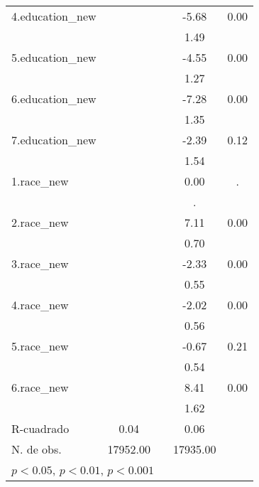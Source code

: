 {\begin{tabular}{l*{2}{cc}}
4.education\_new&                     &            &       -5.68\sym{***}&        0.00\\
            &                     &            &        1.49         &            \\
5.education\_new&                     &            &       -4.55\sym{***}&        0.00\\
            &                     &            &        1.27         &            \\
6.education\_new&                     &            &       -7.28\sym{***}&        0.00\\
            &                     &            &        1.35         &            \\
7.education\_new&                     &            &       -2.39         &        0.12\\
            &                     &            &        1.54         &            \\
1.race\_new  &                     &            &        0.00         &           .\\
            &                     &            &           .         &            \\
2.race\_new  &                     &            &        7.11\sym{***}&        0.00\\
            &                     &            &        0.70         &            \\
3.race\_new  &                     &            &       -2.33\sym{***}&        0.00\\
            &                     &            &        0.55         &            \\
4.race\_new  &                     &            &       -2.02\sym{***}&        0.00\\
            &                     &            &        0.56         &            \\
5.race\_new  &                     &            &       -0.67         &        0.21\\
            &                     &            &        0.54         &            \\
6.race\_new  &                     &            &        8.41\sym{***}&        0.00\\
            &                     &            &        1.62         &            \\
\hline
R-cuadrado  &        0.04         &            &        0.06         &            \\
N. de obs.  &    17952.00         &            &    17935.00         &            \\
\hline\hline
\multicolumn{5}{l}{\footnotesize \sym{*} \(p<0.05\), \sym{**} \(p<0.01\), \sym{***} \(p<0.001\)}\\
\end{tabular}
}
